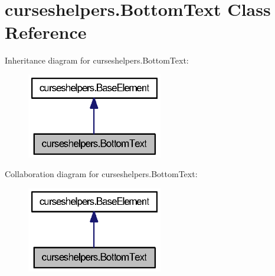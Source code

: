 \section{curseshelpers.\-Bottom\-Text Class Reference}
\label{classcurseshelpers_1_1BottomText}


Inheritance diagram for curseshelpers.\-Bottom\-Text\-:
\nopagebreak
\begin{figure}[H]
\begin{center}
\leavevmode
\includegraphics[width=168pt]{classcurseshelpers_1_1BottomText__inherit__graph}
\end{center}
\end{figure}


Collaboration diagram for curseshelpers.\-Bottom\-Text\-:
\nopagebreak
\begin{figure}[H]
\begin{center}
\leavevmode
\includegraphics[width=168pt]{classcurseshelpers_1_1BottomText__coll__graph}
\end{center}
\end{figure}

